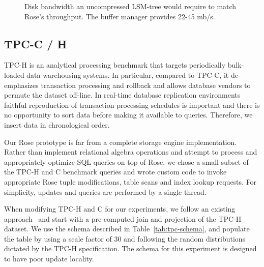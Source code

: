 \documentclass{vldb}
\newcommand{\rows}{Rose\xspace}
\newcommand{\rowss}{Rose's\xspace}
\begin{document}



\begin{figure}
\centering
{}
\caption{Disk bandwidth an uncompressed LSM-tree would
  require to match \rowss throughput.  The buffer manager provides
  22-45 mb/s.}
\label{fig:4R}
\end{figure}

\subsection{TPC-C / H}

TPC-H is an analytical processing benchmark that targets periodically
bulk-loaded data warehousing systems.  In particular, compared to
TPC-C, it de-emphasizes transaction processing and rollback and
allows database vendors to permute the dataset off-line.  In real-time
database replication environments faithful reproduction of
transaction processing schedules is important and there is no
opportunity to sort data before making it available to queries.
Therefore, we insert data in chronological order.

Our \rows prototype is far from a complete storage engine
implementation.  Rather than implement relational algebra operations
and attempt to process and appropriately optimize SQL queries on top
of \rows, we chose a small subset of the TPC-H and C benchmark
queries and wrote custom code to invoke appropriate \rows tuple
modifications, table scans and index lookup requests.  For simplicity,
updates and queries are performed by a single thread.

When modifying TPC-H and C for our experiments, we follow an existing
approach~\cite{entropy,bitsForChronos} and start with a pre-computed
join and projection of the TPC-H dataset.  We use the schema described
in Table~\ref{tab:tpc-schema}, and populate the table by using a scale
factor of 30 and following the random distributions dictated by the
TPC-H specification.  The schema for this experiment is designed to
have poor update locality.
\end{document}
